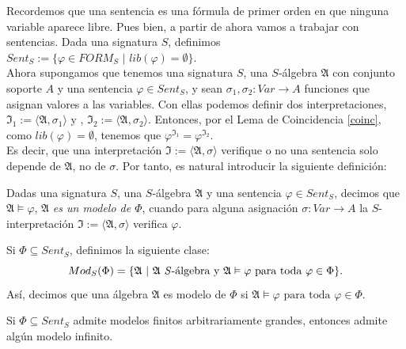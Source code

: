 Recordemos que una sentencia es una fórmula de primer orden en que ninguna variable aparece libre. Pues bien, a partir de ahora vamos a trabajar con sentencias. Dada una signatura $S$, definimos $Sent_S:=\{\varphi\in FORM_S\, \, |\, \, lib(\varphi)=\emptyset\}$.\\

Ahora supongamos que tenemos una signatura $S$, una $S$-álgebra $\mathfrak{A}$ con conjunto soporte $A$ y una sentencia $\varphi\in Sent_S$, y sean $\sigma_1,\sigma_2: Var \rightarrow A$ funciones que asignan valores a las variables. Con ellas podemos definir dos interpretaciones, $\mathfrak{I}_1 := \langle \mathfrak{A}, \sigma_1 \rangle$ y , $\mathfrak{I}_2 := \langle \mathfrak{A}, \sigma_2 \rangle$. Entonces, por el Lema de Coincidencia \ref{coinc}, como $lib(\varphi)=\emptyset$, tenemos que $\varphi^{\mathfrak{I}_1}=\varphi^{\mathfrak{I}_2}$.\\

Es decir, que una interpretación $\mathfrak{I} := \langle \mathfrak{A}, \sigma \rangle$ verifique o no una sentencia solo depende de $\mathfrak{A}$, no de $\sigma$. Por tanto, es natural introducir la siguiente definición:

\begin{definition}
Dadas una signatura $S$, una $S$-álgebra $\mathfrak{A}$ y una sentencia $\varphi\in Sent_S$, decimos que $\mathfrak{A}\vDash\varphi$, $\mathfrak{A}$\textit{ es un modelo de $\Phi$}, cuando para alguna asignación $\sigma : Var \rightarrow A$ la $S$-interpretación $\mathfrak{I} := \langle \mathfrak{A}, \sigma \rangle$ verifica $\varphi$.
\end{definition}

\begin{definition}
Si $\Phi\subseteq Sent_S$, definimos la siguiente clase:
\[Mod_S(\Phi)=\{\mathfrak{A}\, \, |\, \, \mathfrak{A} \text{ \textit{S}-álgebra y }\mathfrak{A}\vDash\varphi \text{ para toda $\varphi\in\Phi$}\}.\]
Así, decimos que una álgebra $\mathfrak{A}$ es modelo de $\Phi$ si $\mathfrak{A}\vDash\varphi \text{ para toda $\varphi\in\Phi$}$.
\end{definition}

\begin{theorem}\label{fintoinf}
Si $\Phi\subseteq Sent_S$ admite modelos finitos arbitrariamente grandes, entonces admite algún modelo infinito.
\end{theorem}

